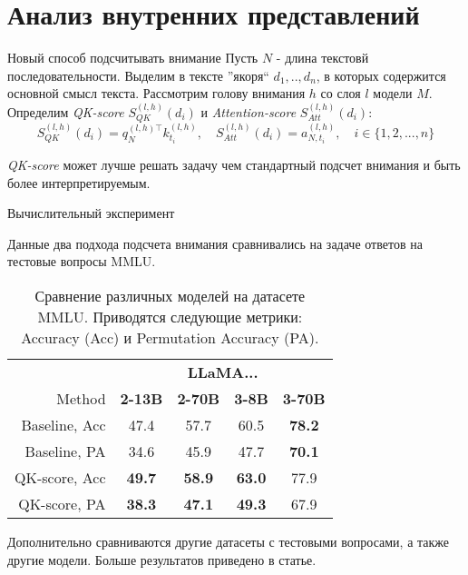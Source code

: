 \documentclass{beamer}
\begin{document}
\section{Анализ внутренних представлений}
\begin{frame}{Новый способ подсчитывать внимание}
    Пусть $N$ - длина текстовй последовательности. Выделим в тексте ''якоря`` $d_1, .., d_n$, в которых содержится основной смысл текста.  Рассмотрим голову внимания $h$ со слоя $l$ модели $M$. Определим \textit{QK-score} $S^{(l, h)}_{QK} (d_i)$ и \textit{Attention-score} $S^{(l, h)}_{Att} (d_i)$:
\begin{equation}
    S^{(l, h)}_{QK} (d_i) =  q_{N}^{(l, h) \top} k^{(l, h)}_{t_i},
    \quad 
    S^{(l, h)}_{Att} (d_i) =  a_{N, t_i}^{(l, h)},
    \quad 
    i \in \{1, 2,...,n\}
\end{equation}

\begin{tcolorbox}[colback=white,colframe=skyblue,title=Гипотеза]
    \textit{QK-score} может лучше решать задачу чем стандартный подсчет внимания и быть более интерпретируемым.
\end{tcolorbox}


\end{frame}

\begin{frame}{Вычислительный эксперимент}

    Данные два подхода подсчета внимания сравнивались на задаче ответов на тестовые вопросы MMLU.

\begin{table}[t]
    \centering
    \begin{tabular}{r|cccc}
        ~  & \multicolumn{4}{c}{\textbf{LLaMA...}} \\
        Method   & {\textbf{2-13B}} &  {\textbf{2-70B}} &  {\textbf{3-8B}} &  {\textbf{3-70B}} \\
        \hline
        Baseline, Acc  & 47.4 & 57.7 & 60.5 & \textbf{78.2}\\
        Baseline, PA & 34.6 & 45.9 & 47.7 & \textbf{70.1}\\
        QK-score, Acc & \textbf{49.7} & \textbf{58.9} & \textbf{63.0} & 77.9\\
        QK-score, PA & \textbf{38.3} & \textbf{47.1} & \textbf{49.3} & 67.9 \\
    \end{tabular}
    \caption{Сравнение различных моделей на датасете MMLU. Приводятся следующие метрики: Accuracy (Acc) и Permutation Accuracy ({PA)}.}
\end{table}

Дополнительно сравниваются другие датасеты с тестовыми вопросами, а также другие модели. Больше результатов приведено в статье.      
\end{frame}
\end{document}
